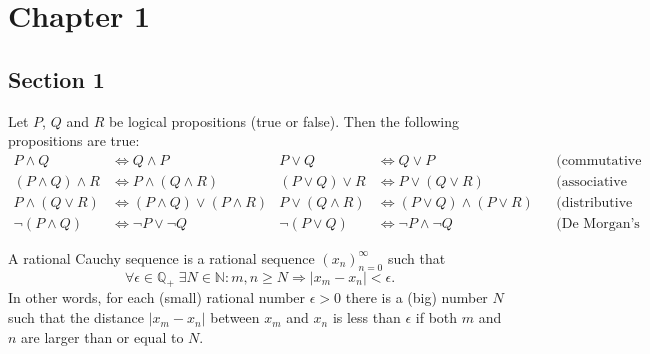 \chapter{Chapter 1}
\section{Section 1}
\begin{theorem}
    \label{th:logicalgebra}
    Let $P$, $Q$ and $R$ be logical propositions (true or false). Then the following propositions are true:
    \small
    \begin{align*}
        P \land Q &\Leftrightarrow Q \land P & P \lor  Q &\Leftrightarrow Q \lor P  && \text{(commutative laws)}\\
        (P \land Q) \land R &\Leftrightarrow P \land (Q \land R) & (P \lor Q)  \lor  R &\Leftrightarrow P \lor  (Q \lor  R) && \text{(associative laws)}\\
        P \land (Q \lor  R) &\Leftrightarrow (P \land Q) \lor  (P \land R) & P \lor  (Q \land R) &\Leftrightarrow (P \lor  Q) \land (P \lor  R) && \text{(distributive laws)}\\
        \lnot (P \land Q) &\Leftrightarrow \lnot P \lor  \lnot Q & \lnot (P \lor  Q) &\Leftrightarrow \lnot P \land \lnot Q && \text{(De Morgan's laws)}
    \end{align*}
\end{theorem}

\begin{definition}
    \label{th:rationalcauchysequence}
    A rational Cauchy sequence is a rational sequence $(x_n)_{n=0}^{\infty}$ such that
    \begin{equation}
        \forall \epsilon \in \mathbb{Q}_+ \; \exists N \in \mathbb{N} : m, n \geq N \Rightarrow |x_m - x_n| < \epsilon.
    \end{equation}
    In other words, for each (small) rational number $\epsilon > 0$ there is a (big) number $N$ such that the distance $|x_m - x_n|$ between $x_m$ and $x_n$ is less than $\epsilon$ if both $m$ and $n$ are larger than or equal to $N$.
\end{definition}

\begin{note}
\lipsum[1]
\end{note}

